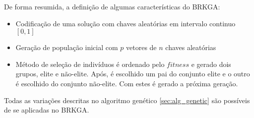\documentclass[conference]{IEEEtran}
\begin{document}
    De forma resumida, a definição de algumas características do BRKGA: 


        \begin{itemize}

        \item Codificação de uma solução com chaves aleatórias em intervalo continuo $[0,1]$ 

        \item Geração de população inicial com $p$ vetores de $n$ chaves aleatórias

        \item Método de seleção de indivíduos é ordenado pelo $fitness$ e gerado dois grupos, elite e não-elite. Após, é escolhido um pai do conjunto elite e o outro é escolhido do conjunto
            não-elite. Com estes é gerado a próxima geração. 

        \end{itemize}

        Todas as variações descritas no algoritmo genético \ref{sec:alg_genetic} são possíveis de se aplicadas no BRKGA. 






\end{document}
